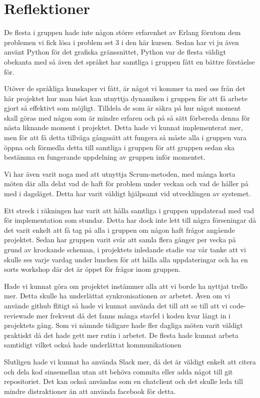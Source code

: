 \chapter{Reflektioner}

\label{Reflektioner} 


De flesta i gruppen hade inte någon större erfarenhet av Erlang förutom dem problemen vi fick lösa i problem set 3 i den här kursen. Sedan har vi ju även använt Python för det grafiska gränssnittet, Python var de flesta väldigt obekanta med så även det språket har samtliga i gruppen fått en bättre förståelse för. 

Utöver de språkliga kunskaper vi fått, är något vi kommer ta med oss från det här projektet hur man bäst kan utnyttja dynamiken i gruppen för att få arbete gjort så effektivt som möjligt. Tilldela de som är säkra på hur något moment skall göras med någon som är mindre erfaren och på så sätt förbereda denna för nästa liknande moment i projektet. Detta hade vi kunnat implementerat mer, men för att få detta tillväga gångssätt att fungera så måste alla i gruppen vara öppna och förmedla detta till samtliga i gruppen för att gruppen sedan ska bestämma en fungerande uppdelning av gruppen inför momentet. 

Vi har även varit noga med att utnyttja Scrum-metoden, med många korta möten där alla delat vad de haft för problem under veckan och vad de håller på med i dagsläget. Detta har varit väldigt hjälpsamt vid utvecklingen av systemet.

Ett streck i räkningen har varit att hålla samtliga i gruppen uppdaterad med vad för implementation som stundar. Detta har dock inte lett till några förseningar då det varit enkelt att få tag på alla i gruppen om någon haft frågor angående projektet. 
Sedan har gruppen varit svår att samla flera gånger per vecka på grund av krockande scheman, i projektets inledande stadie var vår tanke att vi skulle ses varje vardag under lunchen för att hålla alla uppdateringar och ha en sorts workshop där det är öppet för frågor inom gruppen.

Hade vi kunnat göra om projektet instämmer alla att vi borde ha nyttjat trello mer. Detta skulle ha underlättat synkronisationen av arbetet. Även om vi använde github flitigt så hade vi kunnat använda det till att se till att vi code-reviewade mer frekvent då det fanns många stavfel i koden kvar långt in i projektets gång. 
Som vi nämnde tidigare hade fler dagliga möten varit väldigt praktiskt då det hade gett mer rutin i arbetet. De flesta hade kunnat arbeta samtidigt vilket också hade underlättat kommunikationen

Slutligen hade vi kunnat ha använda Slack mer, då det är väldigt enkelt att citera och dela kod sinsemellan utan att behöva commita eller adda något till git repositoriet. Det kan också användas som en chatclient och det skulle leda till mindre distraktioner än att använda facebook för detta. 